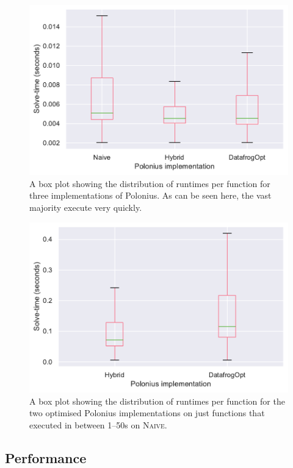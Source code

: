 \documentclass[11pt,a4paper,twoside,openany]{report}
\begin{document}
\begin{figure}
  \includegraphics[width=0.9\linewidth]{Graphs/solvetimes_boxplot.pdf}
  \caption[Runtimes Per Function for Three Polonius Variants]{A box plot
    showing the distribution of runtimes per function for three
    implementations of Polonius. As can be seen here, the vast majority execute
    very quickly.}
  \label{fig:solvetimes}
\end{figure}


\begin{figure}
  \includegraphics[width=0.9\linewidth]{Graphs/solvetimes_boxplot_over_1s.pdf}
  \caption[Runtimes Per Function for Two Polonius Variants on Longer-Running
  Inputs]{A box plot showing the distribution of runtimes per function for the
    two optimised Polonius implementations on just functions that executed in
    between 1--50s on \textsc{Naive}.}
  \label{fig:solvetimes-long}
\end{figure}

\subsection{Performance}\label{sec:inputs:performance}
\end{document}
